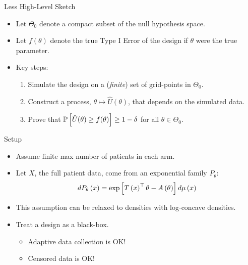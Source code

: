 \begin{frame}{Less High-Level Sketch}
\begin{itemize}
\item Let $\Theta_0$ denote a compact subset of the null
    hypothesis space.
\item Let $f(\theta)$ denote the true Type I Error of the design
    if $\theta$ were the true parameter.
\item Key steps: 
\begin{enumerate}
    \item Simulate the design on a (\emph{finite}) set of grid-points
        in $\Theta_0$.
    \item Construct a process, $\theta \mapsto \hat{U}(\theta)$, 
    that depends on the simulated data.
    \item Prove that $\mathbb{P}\left[\hat{U}(\theta) \geq f(\theta)\right] \geq 1-\delta$ for all $\theta \in \Theta_0$.
    
\end{enumerate}

\end{itemize}
\end{frame}

\begin{frame}{Setup}
\begin{itemize}
    \item Assume finite max number of patients in each arm.
    \item Let $X$, the full patient data, come from an exponential family $P_{\theta}$:
    \begin{align*}
        dP_\theta\left( x \right) = \exp\left[T\left( x \right)^\top \theta - A\left( \theta \right)\right] d\mu\left( x \right)
    \end{align*}
    \item This assumption can be relaxed to densities with log-concave densities.
    \item Treat a design as a black-box.
    \begin{itemize}
        \item Adaptive data collection is OK!\@
        \item Censored data is OK!\@
    \end{itemize}
\end{itemize}
\end{frame}


